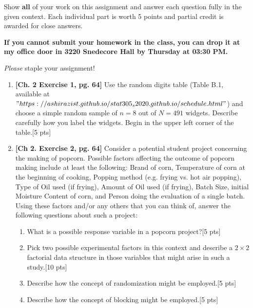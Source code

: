 \documentclass[11pt]{article}\usepackage[]{graphicx}\usepackage[]{color}
\begin{document}

\pagestyle{fancy} 

Show \textbf{all} of your work on this assignment and answer each question fully in the given context. 
Each individual part is worth 5 points and partial credit is awarded for close answers.
\vspace{0.3cm}

\textbf{If you cannot submit your homework in the class, you can drop it at my office door in 3220 Snedecore Hall by Thursday at 03:30 PM.}

\vspace{0.3cm}
\emph{Please} staple your assignment!

\begin{enumerate}

\item \textbf{[Ch. 2 Exercise 1, pg. 64]} Use the random digits table (Table B.1, available at $"https://ashirazist.github.io/stat305_s2020.github.io/schedule.html"$) and choose a simple random sample of $n = 8$ out of $N = 491$ widgets. Describe carefully how you label the widgets. Begin in the upper left corner of the table.[5 pts] 
\item \textbf{[Ch 2. Exercise 2, pg. 64]} Consider a potential student project concerning the making of popcorn. Possible factors affecting the outcome of popcorn making include at least the following: Brand of corn, Temperature of corn at the beginning of cooking, Popping method (e.g. frying vs. hot air popping), Type of Oil used (if frying), Amount of Oil used (if frying), Batch Size, initial Moisture Content of corn, and Person doing the evaluation of a single batch. Using these factors and/or any others that you can think of, answer the following questions about such a project:

      \begin{enumerate}
          \item What is a possible response variable in a popcorn project?[5 pts]
          \item Pick two possible experimental factors in this context and describe a $2 \times 2$ factorial data structure in those variables that might arise in such a study.[10 pts]
          \item Describe how the concept of randomization might be employed.[5 pts]
          \item Describe how the concept of blocking might be employed.[5 pts]
      \end{enumerate}
      

\end{enumerate}
\end{document}
